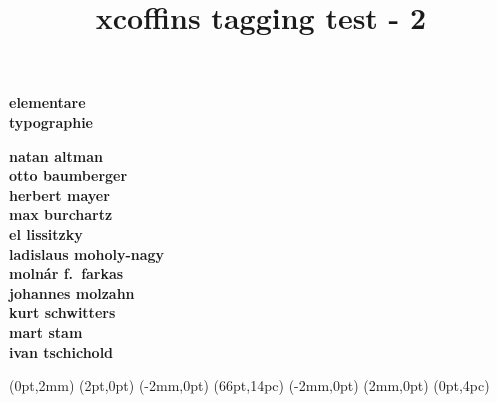 \documentclass{article}
\title{xcoffins tagging test - 2}
\begin{document}
  \NewCoffin \Result
  \NewCoffin \aaa
  \NewCoffin \bbb
  \NewCoffin \ccc
  \NewCoffin \ddd
  \NewCoffin \eee
  \NewCoffin \fff
  \NewCoffin {}
  \NewCoffin {}
  \NewCoffin {}

\SetHorizontalCoffin \Result {}
\SetHorizontalCoffin {}
\SetHorizontalCoffin {}
\SetHorizontalCoffin {}
\SetHorizontalCoffin {}
\SetVerticalCoffin \eee {180pt}
                 {\raggedleft\fontsize{31}{36}\sffamily\bfseries
                      elementare\\
                      typographie}
\SetVerticalCoffin \fff {140pt}
                 {\raggedright \fontsize{13}{14}\sffamily\bfseries
                       natan altman \\
                       otto baumberger \\
                       herbert mayer \\
                       max burchartz \\
                       el lissitzky \\
                       ladislaus moholy-nagy \\
                       moln\'ar f.~farkas \\
                       johannes molzahn \\
                       kurt schwitters \\
                       mart stam \\
                       ivan tschichold}

\RotateCoffin {}
\RotateCoffin {}

\SetHorizontalCoffin {}
\SetHorizontalCoffin {}
\SetHorizontalCoffin {}


\JoinCoffins \Result                \aaa
\JoinCoffins {} (0pt,2mm)
\JoinCoffins {} \bbb     [B,r](2pt,0pt)
\JoinCoffins {} (-2mm,0pt)
\JoinCoffins {} \ccc     [B,l](66pt,14pc)
\JoinCoffins {} \fff     [t,r](-2mm,0pt)
\JoinCoffins {} (2mm,0pt)
\JoinCoffins {} \eee     [B,r]
\JoinCoffins {} \ddd     [B,r](0pt,4pc)
\end{document}
